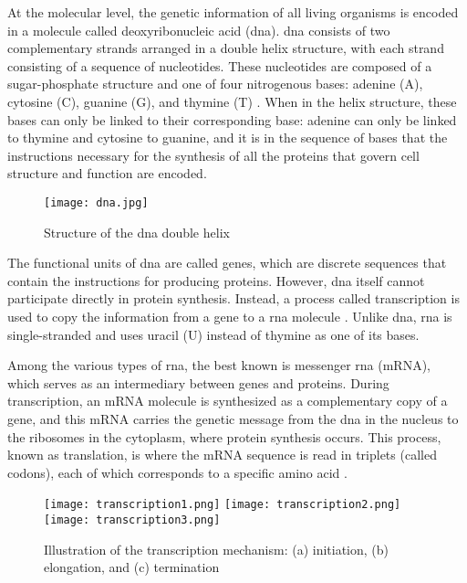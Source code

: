 At the molecular level, the genetic information of all living organisms is
encoded in a molecule called deoxyribonucleic acid (\gls{dna}).
\gls{dna} consists of two complementary strands arranged in a double helix
structure, with each strand consisting of a sequence of nucleotides. These
nucleotides are composed of a sugar-phosphate structure and one of four
nitrogenous bases: adenine (A), cytosine (C), guanine (G), and thymine (T)
\textcite{ConceptsBiology_DNA}. When in the helix structure, these bases can
only be linked to their corresponding base: adenine can only be linked to
thymine and cytosine to guanine, and it is in the sequence of bases that the
instructions necessary for the synthesis of all the proteins that govern cell
structure and function are encoded.

\begin{figure}[h]
  \centering
  \texttt{[image: dna.jpg]}
  \caption{Structure of the \gls{dna} double helix}
  \label{fig:dna}
\end{figure}

The functional units of \gls{dna} are called genes, which are discrete
sequences that contain the instructions for producing proteins. However,
\gls{dna} itself cannot participate directly in protein synthesis.
Instead, a process called transcription is used to copy the information from a
gene to a \gls{rna} molecule
\textcite{basic_biology_NCBI2002}. Unlike \gls{dna}, \gls{rna} is
single-stranded and uses uracil (U) instead of thymine as one of its bases.

Among the various types of \gls{rna}, the best known is messenger
\gls{rna} (mRNA), which serves as an intermediary between genes and
proteins. During transcription, an mRNA molecule is synthesized as a
complementary copy of a gene, and this mRNA carries the genetic message from
the \gls{dna} in the nucleus to the ribosomes in the cytoplasm, where
protein synthesis occurs. This process, known as translation, is where the mRNA
sequence is read in triplets (called codons), each of which corresponds to a
specific amino acid \textcite{central_dogma_molecular}.

\begin{figure}[h]
  \centering
  \texttt{[image: transcription1.png]}
  \texttt{[image: transcription2.png]}
  \texttt{[image: transcription3.png]}
  \caption{Illustration of the transcription mechanism: (a) initiation, (b) elongation, and (c) termination}
  \label{fig:transcription}
\end{figure}

